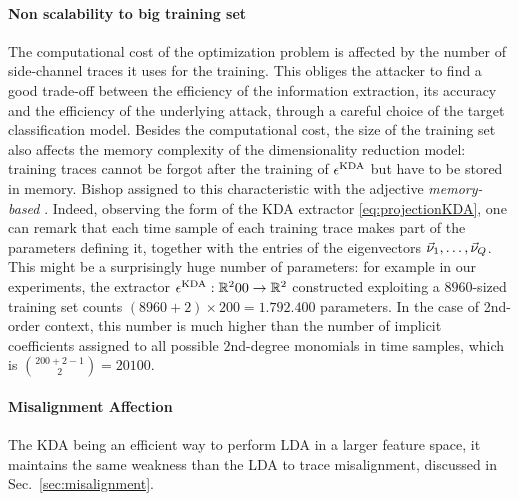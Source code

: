 \paragraph*{Non scalability to big training set} The computational cost of the optimization problem is affected by the number of side-channel traces it uses for the training. This obliges the attacker to find a good trade-off between the efficiency of the information extraction, its accuracy and the efficiency of the underlying attack, through a careful choice of the target classification model. Besides the computational cost, the size of the training set also affects the memory complexity of the dimensionality reduction model: training traces cannot be forgot after the training of $\epsilon^{\mathrm{KDA}}$ but have to be stored in memory. Bishop assigned to this characteristic with the adjective \emph{memory-based} \cite[Chapter~6]{christopher2006pattern}. Indeed, observing the form of the KDA extractor \eqref{eq:projectionKDA}, one can remark that each time sample of each training trace makes part of the parameters defining it, together with the entries of the eigenvectors $\vec{\nu}_1, \dots, \vec{\nu}_Q$. This might be a surprisingly huge number of parameters: for example in our experiments, the extractor $\epsilon^{\mathrm{KDA}}:\mathbb{R}^200\rightarrow\mathbb{R}^2$ constructed exploiting a $8960$-sized training set counts $(8960+2)\times200 = 1.792.400$ parameters. In the case of 2nd-order context, this number is much higher than the number of implicit coefficients assigned to all possible $2$nd-degree monomials in time samples, which is ${{200+2-1}\choose{2}} = 20100$.

\paragraph*{Misalignment Affection} The KDA being an efficient way to perform LDA in a larger feature space, it maintains the same weakness than the LDA to trace misalignment, discussed in Sec.~\ref{sec:misalignment}.  
